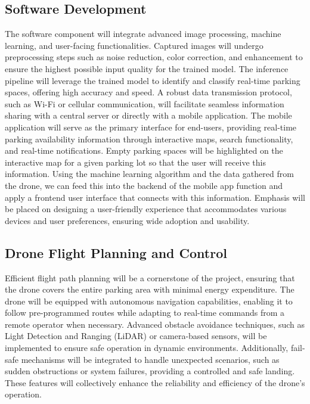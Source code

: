 \documentclass[conference]{IEEEtran}
\begin{document}
\subsection{Software Development}

The software component will integrate advanced image processing, 
machine learning, 
and user-facing functionalities. 
Captured images will undergo preprocessing steps such as noise reduction, 
color correction, 
and enhancement to ensure the highest possible input quality for the trained model. 
The inference pipeline will leverage the trained model to identify and classify real-time parking spaces, 
offering high accuracy and speed. 
A robust data transmission protocol, 
such as Wi-Fi or cellular communication, 
will facilitate seamless information sharing with a central server or directly with a mobile application. 
The mobile application will serve as the primary interface for end-users, 
providing real-time parking availability information through interactive maps, 
search functionality, 
and real-time notifications. 
Empty parking spaces will be highlighted on the interactive map for a given parking lot so that the user will receive this information. 
Using the machine learning algorithm and the data gathered from the drone, 
we can feed this into the backend of the mobile app function and apply a frontend user interface that connects with this information. 
Emphasis will be placed on designing a user-friendly experience that accommodates various devices and user preferences, 
ensuring wide adoption and usability.

\subsection{Drone Flight Planning and Control}

Efficient flight path planning will be a cornerstone of the project, 
ensuring that the drone covers the entire parking area with minimal energy expenditure. 
The drone will be equipped with autonomous navigation capabilities, 
enabling it to follow pre-programmed routes while adapting to real-time commands from a remote operator when necessary. 
Advanced obstacle avoidance techniques, 
such as Light Detection and Ranging 
(LiDAR) 
or camera-based sensors, 
will be implemented to ensure safe operation in dynamic environments. 
Additionally, 
fail-safe mechanisms will be integrated to handle unexpected scenarios, 
such as sudden obstructions or system failures, 
providing a controlled and safe landing. 
These features will collectively enhance the reliability and efficiency of the drone's operation.
\end{document}
